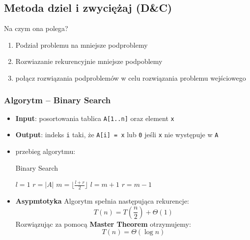 \documentclass{article}
\begin{document}
\subsection*{Metoda dziel i zwyciężaj (D\&C)}
Na czym ona polega?
\begin{enumerate}
    \item Podział problemu na mniejsze podproblemy 
    \item Rozwiazanie rekurencyjnie mniejsze podpoblemy
    \item połącz rozwiązania podproblemów w celu rozwiązania problemu wejściowego
\end{enumerate}
\subsubsection*{Algorytm -- Binary Search}
\begin{itemize}
    \item \textbf{Input}: posortowania tablica \texttt{A[1..n]} oraz element \texttt{x}
    \item \textbf{Output}: indeks \texttt{i} taki, że \texttt{A[i] = x} lub \texttt{0} jeśli \texttt{x} nie występuje w \texttt{A}
        \item przebieg algorytmu: 
            \begin{algorithm}[H]
                \caption{Binary Search}
                \begin{algorithmic}[1]
                        \State $l = 1$
                        \State $r = |A|$
                            \State $m = \lfloor \frac{l+r}{2} \rfloor$
                                \State {}
                                \State $l = m + 1$
                            \Else
                                \State $r = m - 1$
                            \EndIf
                        \EndWhile
                        \State {}
                    \EndProcedure
                \end{algorithmic}
            \end{algorithm}
        \item \textbf{Asypmtotyka}
            Algorytm spełnia następująca rekurencje:
            \[
                T(n) = T(\frac{n}{2}) + \Theta(1)
            \]
            Rozwiązując za pomocą \textbf{Master Theorem} otrzymujemy:
            \[
                T(n) = \Theta(\log n)
            \]
\end{itemize}
\vspace{1\baselineskip}
\end{document}
